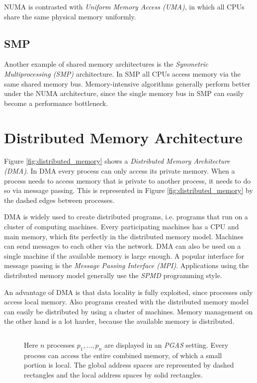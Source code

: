 NUMA is contrasted with \emph{Uniform Memory Access (UMA)}, in which all CPUs share the same physical memory uniformly.

\subsection{SMP}
Another example of shared memory architectures is the \emph{Symmetric Multiprocessing (SMP)} architecture. In SMP all CPUs access memory via the same shared memory bus. Memory-intensive algorithms generally perform better under the NUMA architecture, since the single memory bus in SMP can easily become a performance bottleneck.

\section{Distributed Memory Architecture}
Figure \ref{fig:distributed_memory} shows a \emph{Distributed Memory Architecture (DMA)}. In DMA every process can only access its private memory. When a process needs to access memory that is private to another process, it needs to do so via message passing. This is represented in Figure \ref{fig:distributed_memory} by the dashed edges between processes. 

DMA is widely used to create distributed programs, i.e. programs that run on a cluster of computing machines. Every participating machines has a CPU and main memory, which fits perfectly in the distributed memory model. Machines can send messages to each other via the network. DMA can also be used on a single machine if the available memory is large enough. A popular interface for message passing is the \emph{Message Passing Interface (MPI)}. Applications using the distributed memory model generally use the \emph{SPMD} programming style.

An advantage of DMA is that data locality is fully exploited, since processes only access local memory. Also programs created with the distributed memory model can easily be distributed by using a cluster of machines. Memory management on the other hand is a lot harder, because the available memory is distributed.

\begin{figure}
	\centering
	\subfloat[PGAS] {
		
		\label{fig:pgas}
	}
	$\hspace{36pt}$
	\caption{Here $n$ processes $p_1, \dots, p_n$ are displayed in an \emph{PGAS} setting. Every process can access the entire combined memory, of which a small portion is local. The global address spaces are represented by dashed rectangles and the local address spaces by solid rectangles. }
	\label{fig:pgas_hybrid_pgas}
\end{figure}

